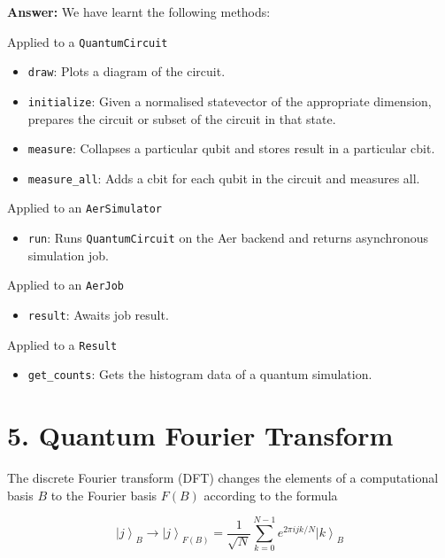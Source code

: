 \documentclass[11pt,dvipsnames]{article}
\begin{document}
    \textbf{Answer:} We have learnt the following methods:

    Applied to a \texttt{QuantumCircuit} 

    \begin{itemize}
        \item \texttt{draw}: Plots a diagram of
        the circuit. 
        \item \texttt{initialize}: Given a normalised statevector of
        the appropriate dimension, prepares the circuit or subset of the circuit
        in that state. 
        \item \texttt{measure}: Collapses a particular qubit and
        stores result in a particular cbit. 
        \item \texttt{measure\_all}: Adds a cbit
        for each qubit in the circuit and measures all.
    \end{itemize}
    
    Applied to an \texttt{AerSimulator} 
    
    \begin{itemize}
        \item  \texttt{run}: Runs \texttt{QuantumCircuit} on the Aer backend and returns 
        asynchronous simulation job.
    \end{itemize}
    

    Applied to an \texttt{AerJob} 

    \begin{itemize}
        \item \texttt{result}: Awaits job result.
    \end{itemize}
    
    Applied to a \texttt{Result} 
    
    \begin{itemize}
        \item \texttt{get\_counts}: Gets the histogram
        data of a quantum simulation.
    \end{itemize}
    

    \section*{5. Quantum Fourier Transform}\label{quantum-fourier-transform}


    The discrete Fourier transform (DFT) changes the elements of a
computational basis \(B\) to the Fourier basis \(F(B)\) according to the
formula

\[
\left|j\right\rangle_{B}\rightarrow \left|j\right\rangle_{F(B)} =  \frac{1}{\sqrt{N}}\sum^{N-1}_{k=0} e^{2\pi i j k /N}\left|k\right\rangle_{B}
\]
\end{document}
